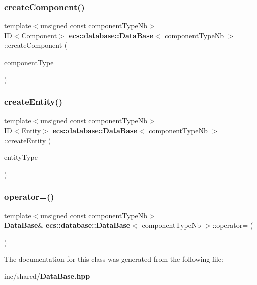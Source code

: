 \subsubsection{create\+Component()}
{\footnotesize\ttfamily template$<$unsigned const component\+Type\+Nb$>$ \\
ID$<$Component$>$ {\bf ecs\+::database\+::\+Data\+Base}$<$ component\+Type\+Nb $>$\+::create\+Component (\begin{DoxyParamCaption}\item[{Component\+Type const}]{component\+Type }\end{DoxyParamCaption})}

\label{classecs_1_1database_1_1_data_base_aa2a54122ba4fbc1e3ec47b9c57a6b541} 
\subsubsection{create\+Entity()}
{\footnotesize\ttfamily template$<$unsigned const component\+Type\+Nb$>$ \\
ID$<$Entity$>$ {\bf ecs\+::database\+::\+Data\+Base}$<$ component\+Type\+Nb $>$\+::create\+Entity (\begin{DoxyParamCaption}\item[{Entity\+Type const}]{entity\+Type }\end{DoxyParamCaption})}

\label{classecs_1_1database_1_1_data_base_a5117ff72440665221fa33b91f8f61f64} 
\subsubsection{operator=()}
{\footnotesize\ttfamily template$<$unsigned const component\+Type\+Nb$>$ \\
{\bf Data\+Base}\& {\bf ecs\+::database\+::\+Data\+Base}$<$ component\+Type\+Nb $>$\+::operator= (\begin{DoxyParamCaption}\item[{{\bf Data\+Base}$<$ component\+Type\+Nb $>$ const \&}]{ }\end{DoxyParamCaption})\hspace{0.3cm}{\ttfamily [delete]}}



The documentation for this class was generated from the following file\+:\begin{DoxyCompactItemize}
\item 
inc/shared/{\bf Data\+Base.\+hpp}\end{DoxyCompactItemize}
